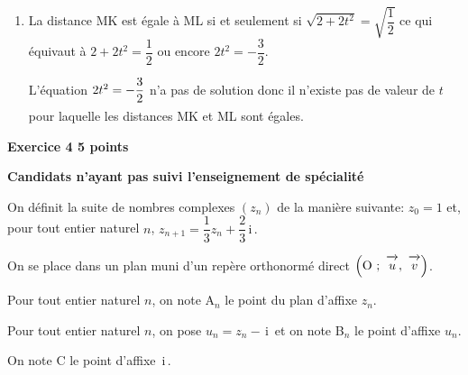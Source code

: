 \documentclass[10pt,a4paper]{article}
\newcommand{\vect}[1]{\overrightarrow{\,\mathstrut#1\,}}
\def\Ouv{$\left(\text{O}~;~\vect{u},~\vect{v}\right)$}
\renewcommand{\i}{\mathrm{\,i\,}}%
\newcommand{\ds}{\displaystyle}
\begin{document}
\begin{enumerate}
\begin{enumerate}
\end{enumerate}

\item %
La distance MK est égale à ML si et seulement si
$\ds\sqrt{2+2t^2} = \ds\sqrt{\dfrac{1}{2}}$
ce qui équivaut à
$2+2t^2 = \dfrac{1}{2}$ ou encore $2t^2 = -\dfrac{3}{2}$.

L'équation $2t^2 = -\dfrac{3}{2\rule[-3pt]{0pt}{0pt}}$ n'a pas de solution donc il n'existe pas de valeur de $t$ pour laquelle les distances MK et ML sont égales.


\end{enumerate}

\vspace{0,5cm}

\textbf{Exercice 4 \hfill 5 points}

\medskip

\textbf{Candidats n'ayant pas suivi l'enseignement de spécialité}

\bigskip

On définit la suite de nombres complexes $(z_n)$ de la manière suivante: $z_0=1$ et, pour tout entier naturel $n$,
$z_{n+1} = \dfrac{1}{3} z_{n} + \dfrac{2}{3}\i.$

On se place dans un plan muni d'un repère orthonormé direct \Ouv.

Pour tout entier naturel $n$, on note A$_{n}$ le point du plan d'affixe $z_n$.

Pour tout entier naturel $n$, on pose $u_n=z_n-\i$ et on note B$_n$ le point d'affixe $u_n$.

On note C le point d'affixe $\i$.
\end{document}
